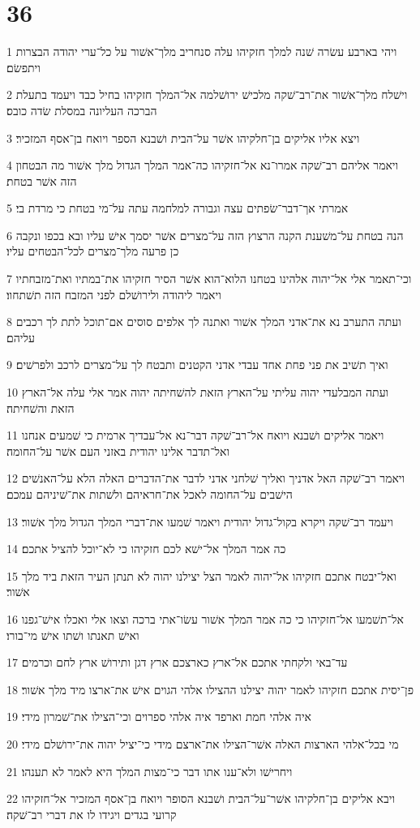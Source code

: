 \chapter{36}

\par 1 ויהי בארבע עשׂרה שׁנה למלך חזקיהו עלה סנחריב מלך־אשׁור על כל־ערי יהודה הבצרות ויתפשׂם׃
\par 2 וישׁלח מלך־אשׁור את־רב־שׁקה מלכישׁ ירושׁלמה אל־המלך חזקיהו בחיל כבד ויעמד בתעלת הברכה העליונה במסלת שׂדה כובס׃
\par 3 ויצא אליו אליקים בן־חלקיהו אשׁר על־הבית ושׁבנא הספר ויואח בן־אסף המזכיר׃
\par 4 ויאמר אליהם רב־שׁקה אמרו־נא אל־חזקיהו כה־אמר המלך הגדול מלך אשׁור מה הבטחון הזה אשׁר בטחת׃
\par 5 אמרתי אך־דבר־שׂפתים עצה וגבורה למלחמה עתה על־מי בטחת כי מרדת בי׃
\par 6 הנה בטחת על־משׁענת הקנה הרצוץ הזה על־מצרים אשׁר יסמך אישׁ עליו ובא בכפו ונקבה כן פרעה מלך־מצרים לכל־הבטחים עליו׃
\par 7 וכי־תאמר אלי אל־יהוה אלהינו בטחנו הלוא־הוא אשׁר הסיר חזקיהו את־במתיו ואת־מזבחתיו ויאמר ליהודה ולירושׁלם לפני המזבח הזה תשׁתחוו׃
\par 8 ועתה התערב נא את־אדני המלך אשׁור ואתנה לך אלפים סוסים אם־תוכל לתת לך רכבים עליהם׃
\par 9 ואיך תשׁיב את פני פחת אחד עבדי אדני הקטנים ותבטח לך על־מצרים לרכב ולפרשׁים׃
\par 10 ועתה המבלעדי יהוה עליתי על־הארץ הזאת להשׁחיתה יהוה אמר אלי עלה אל־הארץ הזאת והשׁחיתה׃
\par 11 ויאמר אליקים ושׁבנא ויואח אל־רב־שׁקה דבר־נא אל־עבדיך ארמית כי שׁמעים אנחנו ואל־תדבר אלינו יהודית באזני העם אשׁר על־החומה׃
\par 12 ויאמר רב־שׁקה האל אדניך ואליך שׁלחני אדני לדבר את־הדברים האלה הלא על־האנשׁים הישׁבים על־החומה לאכל את־חראיהם ולשׁתות את־שׁיניהם עמכם׃
\par 13 ויעמד רב־שׁקה ויקרא בקול־גדול יהודית ויאמר שׁמעו את־דברי המלך הגדול מלך אשׁור׃
\par 14 כה אמר המלך אל־ישׁא לכם חזקיהו כי לא־יוכל להציל אתכם׃
\par 15 ואל־יבטח אתכם חזקיהו אל־יהוה לאמר הצל יצילנו יהוה לא תנתן העיר הזאת ביד מלך אשׁור׃
\par 16 אל־תשׁמעו אל־חזקיהו כי כה אמר המלך אשׁור עשׂו־אתי ברכה וצאו אלי ואכלו אישׁ־גפנו ואישׁ תאנתו ושׁתו אישׁ מי־בורו׃
\par 17 עד־באי ולקחתי אתכם אל־ארץ כארצכם ארץ דגן ותירושׁ ארץ לחם וכרמים׃
\par 18 פן־יסית אתכם חזקיהו לאמר יהוה יצילנו ההצילו אלהי הגוים אישׁ את־ארצו מיד מלך אשׁור׃
\par 19 איה אלהי חמת וארפד איה אלהי ספרוים וכי־הצילו את־שׁמרון מידי׃
\par 20 מי בכל־אלהי הארצות האלה אשׁר־הצילו את־ארצם מידי כי־יציל יהוה את־ירושׁלם מידי׃
\par 21 ויחרישׁו ולא־ענו אתו דבר כי־מצות המלך היא לאמר לא תענהו׃
\par 22 ויבא אליקים בן־חלקיהו אשׁר־על־הבית ושׁבנא הסופר ויואח בן־אסף המזכיר אל־חזקיהו קרועי בגדים ויגידו לו את דברי רב־שׁקה׃


